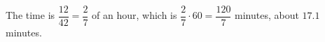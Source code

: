 The time is $\dfrac{12}{42}=\dfrac27$ of an hour, which is $\dfrac27\cdot60=\boxed{\dfrac{120}{7}}$ minutes, about $17.1$ minutes.
